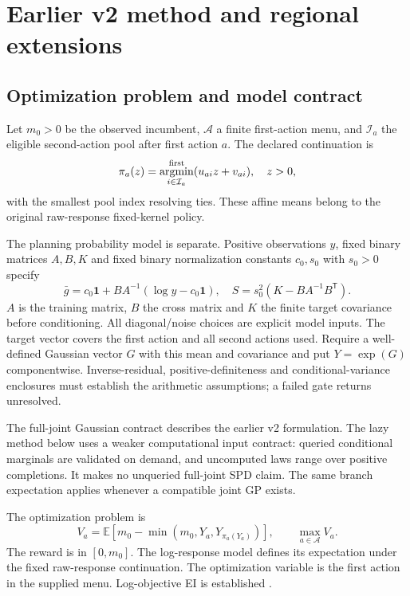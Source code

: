 \section{Earlier v2 method and regional extensions}\label{sec:positive_method}

\subsection{Optimization problem and model contract}

Let $m_0>0$ be the observed incumbent, $\mathcal A$ a finite first-action menu, and $\mathcal I_a$ the eligible second-action pool after first action $a$. The declared continuation is
\begin{equation}
\pi_a(z)=\mathop{\rm argmin}^{\rm first}_{i\in\mathcal I_a}
       (u_{ai}z+v_{ai}),\quad z>0,                 \label{eq:positive_policy}
\end{equation}
with the smallest pool index resolving ties. These affine means belong to the original raw-response fixed-kernel policy.

The planning probability model is separate. Positive observations $y$, fixed binary matrices $A,B,K$ and fixed binary normalization constants $c_0,s_0$ with $s_0>0$ specify
\begin{equation}
\bar g=c_0\mathbf1+BA^{-1}(\log y-c_0\mathbf1),\quad
S=s_0^2(K-BA^{-1}B^{\mathsf T}).                   \label{eq:positive_model}
\end{equation}
$A$ is the training matrix, $B$ the cross matrix and $K$ the finite target covariance before conditioning. All diagonal/noise choices are explicit model inputs. The target vector covers the first action and all second actions used. Require a well-defined Gaussian vector $G$ with this mean and covariance and put $Y=\exp(G)$ componentwise. Inverse-residual, positive-definiteness and conditional-variance enclosures must establish the arithmetic assumptions; a failed gate returns unresolved.

The full-joint Gaussian contract describes the earlier v2 formulation. The lazy method below uses a weaker computational input contract: queried conditional marginals are validated on demand, and uncomputed laws range over positive completions. It makes no unqueried full-joint SPD claim. The same branch expectation applies whenever a compatible joint GP exists.

The optimization problem is
\begin{equation}
V_a=\mathbb E[m_0-\min(m_0,Y_a,Y_{\pi_a(Y_a)})],
\qquad \max_{a\in\mathcal A}V_a.                  \label{eq:positive_objective}
\end{equation}
The reward is in $[0,m_0]$. The log-response model defines its expectation under the fixed raw-response continuation. The optimization variable is the first action in the supplied menu. Log-objective EI is established \citep{ref45}.

